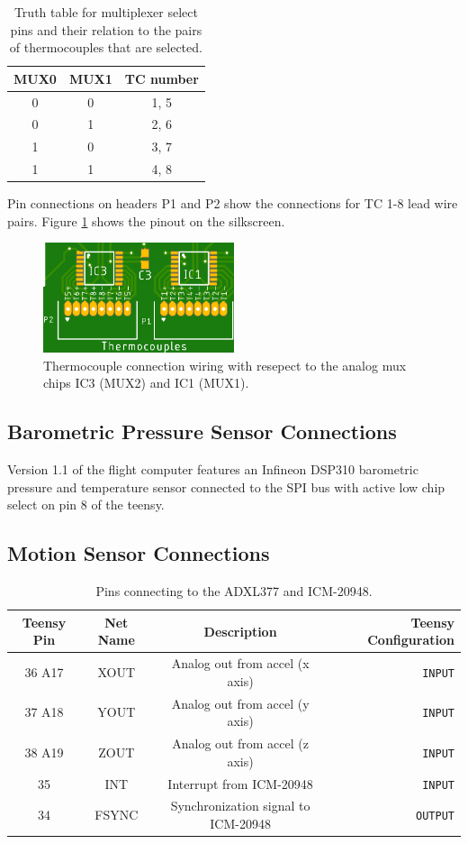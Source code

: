 \documentclass{article}
\begin{document}
\begin{table}[H]
  \centering
  \begin{tabular}{c | c | c}
    MUX0 & MUX1 & TC number \\
    \hline
    0 & 0 & 1, 5 \\
    0 & 1 & 2, 6 \\
    1 & 0 & 3, 7 \\
    1 & 1 & 4, 8
  \end{tabular}
  \caption{Truth table for multiplexer select pins and their relation to the pairs of thermocouples that are selected.}
  \label{tab:tc-mux-sel}
\end{table}
%
Pin connections on headers P1 and P2 show the connections for TC 1-8 lead wire pairs. Figure \ref{fig:tc-conn} shows the pinout on the silkscreen.
%
\begin{figure}[H]
    \centering
    \includegraphics[width=0.5\textwidth]{images/krepe-thermocouples.png}
    \caption{Thermocouple connection wiring with resepect to the analog mux chips IC3 (MUX2) and IC1 (MUX1).}
    \label{fig:tc-conn}
\end{figure}


\subsection{Barometric Pressure Sensor Connections}
Version 1.1 of the flight computer features an Infineon DSP310 barometric pressure and temperature sensor connected to the SPI bus with active low chip select on pin 8 of the teensy.


\subsection{Motion Sensor Connections}

\begin{table}[H]
    \centering
    \begin{tabular}{c|c|c|r}
    Teensy Pin & Net Name  & Description   & Teensy Configuration \\
    \hline 
    36 A17 & XOUT & Analog out from accel (x axis) & \texttt{INPUT} \\
    37 A18 & YOUT & Analog out from accel (y axis) & \texttt{INPUT} \\
    38 A19 & ZOUT & Analog out from accel (z axis) & \texttt{INPUT} \\
    35 & INT & Interrupt from ICM-20948 & \texttt{INPUT} \\
    34 & FSYNC & Synchronization signal to ICM-20948 & \texttt{OUTPUT} 
    \end{tabular}
    \caption{Pins connecting to the ADXL377 and ICM-20948.}
    \label{tab:pins_motionsensor}
\end{table}
\end{document}
